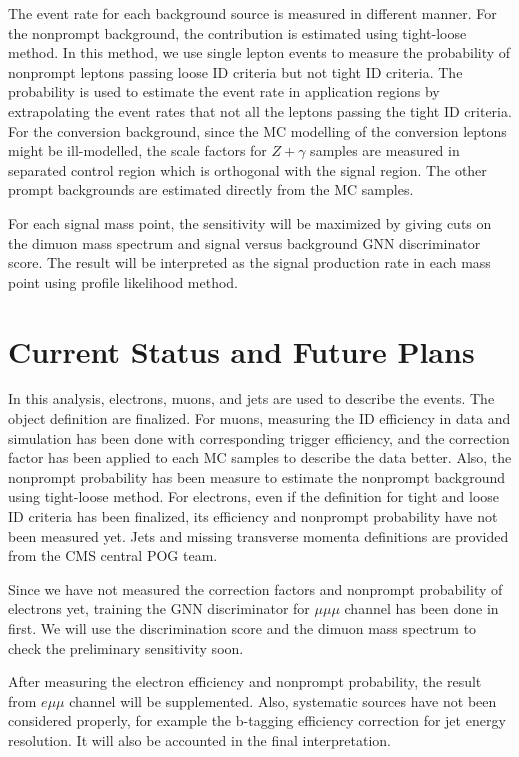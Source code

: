 \documentclass[
12pt, %
a4paper, %
oneside, %
headinclude,footinclude, %
BCOR5mm, %
]{scrartcl}
\begin{document}
The event rate for each background source is measured in different manner.
For the nonprompt background, the contribution is estimated using
tight-loose method. In this method, we use single lepton events to measure the probability
of nonprompt leptons passing loose ID criteria but not tight ID criteria. The probability
is used to estimate the event rate in application regions by extrapolating the event rates
that not all the leptons passing the tight ID criteria. For the conversion background,
since the MC modelling of the conversion leptons might be ill-modelled, the scale factors for
$Z+\gamma$ samples are measured in separated control region which is orthogonal with the signal region.
The other prompt backgrounds are estimated directly from the MC samples.

For each signal mass point, the sensitivity will be maximized by giving cuts 
on the dimuon mass spectrum and signal versus background GNN discriminator score.
The result will be interpreted as the signal production rate in each mass point
using profile likelihood method. 

\section{Current Status and Future Plans}
In this analysis, electrons, muons, and jets are used to describe the events.
The object definition are finalized. For muons, measuring the ID efficiency in
data and simulation has been done with corresponding trigger efficiency, and
the correction factor has been applied to each MC samples to describe the data better.
Also, the nonprompt probability has been measure to estimate the nonprompt background
using tight-loose method. For electrons, even if the definition for tight and loose ID
criteria has been finalized, its efficiency and nonprompt probability have not been measured yet.
Jets and missing transverse momenta definitions are provided from the CMS central POG team.

Since we have not measured the correction factors and nonprompt probability of electrons yet,
training the GNN discriminator for $\mu\mu\mu$ channel has been done in first. We will use the
discrimination score and the dimuon mass spectrum to check the preliminary sensitivity soon.

After measuring the electron efficiency and nonprompt probability, the result from $e\mu\mu$
channel will be supplemented. Also, systematic sources have not been considered properly,
for example the b-tagging efficiency correction for jet energy resolution. It will also be
accounted in the final interpretation.
\end{document}
